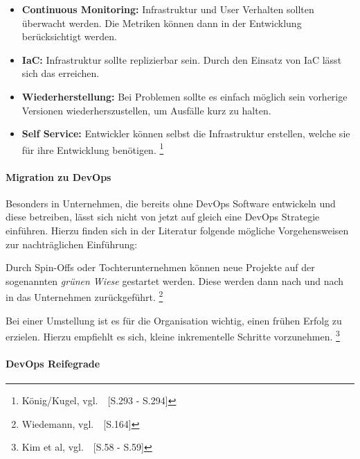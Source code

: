 \begin{itemize}
    \item \textbf{Continuous Monitoring:}
    Infrastruktur und User Verhalten sollten überwacht werden.
    Die Metriken können dann in der Entwicklung berücksichtigt werden.

    \item \textbf{IaC:}
    Infrastruktur sollte replizierbar sein.
    Durch den Einsatz von IaC lässt sich das erreichen.

    \item \textbf{Wiederherstellung:}
    Bei Problemen sollte es einfach möglich sein vorherige Versionen wiederherszustellen, um Ausfälle kurz zu halten.

    \item \textbf{Self Service:}
    Entwickler können selbst die Infrastruktur erstellen, welche sie für ihre Entwicklung benötigen. \footnote{König/Kugel, vgl.~\cite{Konig2019}~[S.293 - S.294]}
\end{itemize}

\paragraph{Migration zu DevOps}

Besonders in Unternehmen, die bereits ohne DevOps Software entwickeln und diese betreiben, lässt sich nicht von jetzt auf gleich eine DevOps Strategie einführen.
Hierzu finden sich in der Literatur folgende mögliche Vorgehensweisen zur nachträglichen Einführung:

Durch Spin-Offs oder Tochterunternehmen können neue Projekte auf der sogenannten \textsl{grünen Wiese} gestartet werden.
Diese werden dann nach und nach in das Unternehmen zurückgeführt. \footnote{Wiedemann, vgl.~\cite{Wiedemann2019}~[S.164]}

Bei einer Umstellung ist es für die Organisation wichtig, einen frühen Erfolg zu erzielen.
Hierzu empfiehlt es sich, kleine inkrementelle Schritte vorzunehmen. \footnote{Kim et al, vgl.~\cite{Kim2018}~[S.58 - S.59]}

\paragraph{DevOps Reifegrade}\label{devops_reifegraden}

